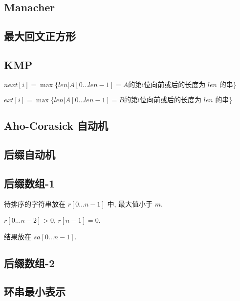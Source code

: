 \documentclass[landscape, twocolumn, 8pt, a4paper, twoside]{extarticle}
\begin{document}
\subsection{Manacher}


\subsection{最大回文正方形}


\subsection{KMP}
$next[i] = \max\{len | A[0 \ldots len - 1] = A \textrm{的第i位向前或后的长度为 $len$ 的串} \}$

$ext[i] = \max\{len | A[0 \ldots len - 1] = B \textrm{的第i位向前或后的长度为 $len$ 的串} \}$


\subsection{Aho-Corasick 自动机}


\subsection{后缀自动机}


\subsection{后缀数组-1}
待排序的字符串放在 $r[0 \ldots n - 1]$ 中, 最大值小于 $m$.

$r[0 \ldots n - 2] > 0$, $r[n - 1] = 0$.

结果放在 $sa[0 \ldots n - 1]$.


\subsection{后缀数组-2}


\subsection{环串最小表示}

\end{document}
